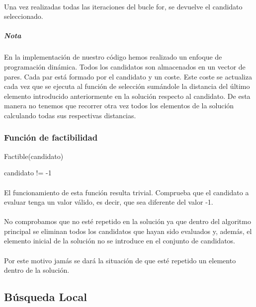 \documentclass{article}
\begin{document}
	\paragraph{}Una vez realizadas todas las iteraciones del bucle for, se devuelve el candidato seleccionado.
	
	\subparagraph{Nota}En la implementación de nuestro código hemos realizado un enfoque de programación dinámica. Todos los candidatos son almacenados en un vector de pares. Cada par está formado por el candidato y un coste. Este coste se actualiza cada vez que se ejecuta al función de selección sumándole la distancia del último elemento introducido anteriormente en la solución respecto al candidato. De esta manera no tenemos que recorrer otra vez todos los elementos de la solución calculando todas sus respectivas distancias.

	\subsubsection{Función de factibilidad}
	\begin{algorithm}[H]
		\caption{Factible(candidato)}
		\begin{algorithmic}
			\RETURN candidato != -1
		\end{algorithmic}
	\end{algorithm}

	\paragraph{}El funcionamiento de esta función resulta trivial. Comprueba que el candidato a evaluar tenga un valor válido, es decir, que sea diferente del valor -1. 
	
	\paragraph{}No comprobamos que no esté repetido en la solución ya que dentro del algoritmo principal se eliminan todos los candidatos que hayan sido evaluados y, además, el elemento inicial de la solución no se introduce en el conjunto de candidatos. 
	
	\paragraph{}Por este motivo jamás se dará la situación de que esté repetido un elemento dentro de la solución.

	
	\subsection{Búsqueda Local}
	
\end{document}
